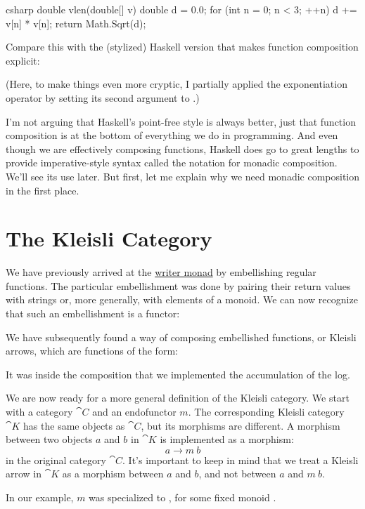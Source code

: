 \begin{snip}{csharp}
double vlen(double[] v) {
    double d = 0.0;
    for (int n = 0; n < 3; ++n)
        d += v[n] * v[n];
    return Math.Sqrt(d);
}
\end{snip}
Compare this with the (stylized) Haskell version that makes function
composition explicit:

(Here, to make things even more cryptic, I partially applied the
exponentiation operator \code{(\^{})} by setting its second argument
to .)

I'm not arguing that Haskell's point-free style is always better, just
that function composition is at the bottom of everything we do in
programming. And even though we are effectively composing functions,
Haskell does go to great lengths to provide imperative-style syntax
called the  notation for monadic composition. We'll see its
use later. But first, let me explain why we need monadic composition in
the first place.

\section{The Kleisli Category}

We have previously arrived at the
\hyperref[kleisli-categories]{writer
  monad} by embellishing regular functions. The particular embellishment
was done by pairing their return values with strings or, more generally,
with elements of a monoid. We can now recognize that such an embellishment
is a functor:

We have subsequently found a way of composing embellished functions, or
Kleisli arrows, which are functions of the form:

It was inside the composition that we implemented the accumulation of
the log.

We are now ready for a more general definition of the Kleisli category.
We start with a category $\cat{C}$ and an endofunctor $m$. The
corresponding Kleisli category $\cat{K}$ has the same objects as
$\cat{C}$, but its morphisms are different. A morphism between two
objects $a$ and $b$ in $\cat{K}$ is implemented as a
morphism:
\[a \to m\ b\]
in the original category $\cat{C}$. It's important to keep in mind that
we treat a Kleisli arrow in $\cat{K}$ as a morphism between $a$
and $b$, and not between $a$ and $m\ b$.

In our example, $m$ was specialized to , for
some fixed monoid .

